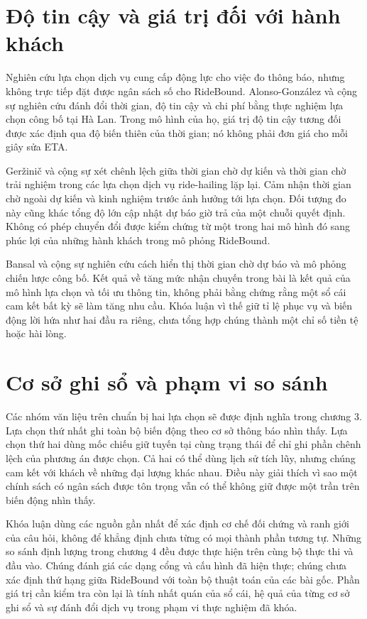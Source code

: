 \section{Độ tin cậy và giá trị đối với hành khách}

Nghiên cứu lựa chọn dịch vụ cung cấp động lực cho việc đo thông báo, nhưng không trực
tiếp đặt được ngân sách số cho RideBound. Alonso-González và cộng sự
\cite{alonsogonzalez2020} nghiên cứu đánh đổi thời gian, độ tin cậy và chi phí bằng
thực nghiệm lựa chọn công bố tại Hà Lan. Trong mô hình của họ, giá trị độ tin cậy
tương đối được xác định qua độ biến thiên của thời gian; nó không phải đơn giá cho
mỗi giây sửa ETA.

Geržinič và cộng sự \cite{gerzinic2023} xét chênh lệch giữa thời gian chờ dự kiến và
thời gian chờ trải nghiệm trong các lựa chọn dịch vụ ride-hailing lặp lại. Cảm nhận
thời gian chờ ngoài dự kiến và kinh nghiệm trước ảnh hưởng tới lựa chọn. Đối tượng
đo này cũng khác tổng độ lớn cập nhật dự báo giờ trả của một chuỗi quyết định.
Không có phép chuyển đổi được kiểm chứng từ một trong hai mô hình đó sang phúc lợi
của những hành khách trong mô phỏng RideBound.

Bansal và cộng sự \cite{bansal2019} nghiên cứu cách hiển thị thời gian chờ dự báo và
mô phỏng chiến lược công bố. Kết quả về tăng mức nhận chuyến trong bài là kết quả
của mô hình lựa chọn và tối ưu thông tin, không phải bằng chứng rằng một sổ cái cam
kết bất kỳ sẽ làm tăng nhu cầu. Khóa luận vì thế giữ tỉ lệ phục vụ và biến động lời
hứa như hai đầu ra riêng, chưa tổng hợp chúng thành một chỉ số tiền tệ hoặc hài lòng.

\section{Cơ sở ghi sổ và phạm vi so sánh}

Các nhóm văn liệu trên chuẩn bị hai lựa chọn sẽ được định nghĩa trong chương 3.
Lựa chọn thứ nhất ghi toàn bộ biến động theo cơ sở thông báo nhìn thấy. Lựa chọn thứ hai
dùng mốc chiếu giữ tuyến tại cùng trạng thái để chỉ ghi phần chênh lệch của phương án được chọn.
Cả hai có thể dùng lịch sử tích lũy, nhưng chúng cam kết với khách về những đại lượng
khác nhau. Điều này giải thích vì sao một chính sách có ngân sách được tôn trọng vẫn
có thể không giữ được một trần trên biến động nhìn thấy.

Khóa luận dùng các nguồn gần nhất để xác định cơ chế đối chứng và ranh giới của câu
hỏi, không để khẳng định chưa từng có mọi thành phần tương tự. Những so sánh định
lượng trong chương 4 đều được thực hiện trên cùng bộ thực thi và đầu vào. Chúng đánh giá
các dạng cổng và cấu hình đã hiện thực; chúng chưa xác định thứ hạng giữa RideBound
với toàn bộ thuật toán của các bài gốc. Phần giá trị cần kiểm tra còn lại là tính
nhất quán của sổ cái, hệ quả của từng cơ sở ghi sổ và sự đánh đổi dịch vụ trong phạm
vi thực nghiệm đã khóa.
